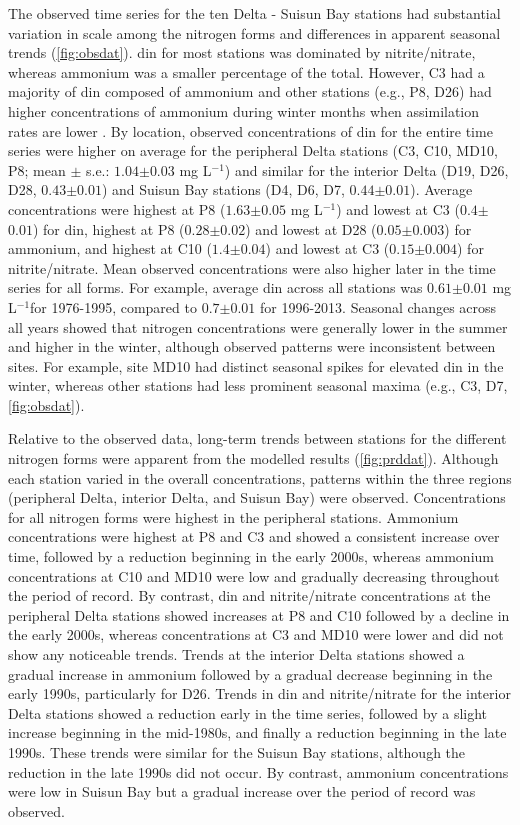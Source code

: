 \documentclass[letterpaper,12pt,oneside]{article}\usepackage[]{graphicx}\usepackage[]{color}
\newcommand{\mgl}{mg L$^{-1}$}
\begin{document}
The observed time series for the ten Delta - Suisun Bay stations had substantial variation in scale among the nitrogen forms and differences in apparent seasonal trends (\cref{fig:obsdat}).  \ac{din} for most stations was dominated by nitrite/nitrate, whereas ammonium was a smaller percentage of the total.  However, C3 had a majority of \ac{din} composed of ammonium and other stations (e.g., P8, D26) had higher concentrations of ammonium during winter months when assimilation rates are lower \citep{Novick15}.  By location, observed concentrations of \ac{din} for the entire time series were higher on average for the peripheral Delta stations (C3, C10, MD10, P8; mean $\pm$ s.e.: $1.04$$\pm$$0.03$ \mgl) and similar for the interior Delta (D19, D26, D28, $0.43$$\pm$$0.01$) and Suisun Bay stations (D4, D6, D7, $0.44$$\pm$$0.01$).  Average concentrations were highest at P8 ($1.63$$\pm$$0.05$ \mgl) and lowest at C3 ($0.4$$\pm$$0.01$) for \ac{din}, highest at P8 ($0.28$$\pm$$0.02$) and lowest at D28 ($0.05$$\pm$$0.003$) for ammonium, and highest at C10 ($1.4$$\pm$$0.04$) and lowest at C3 ($0.15$$\pm$$0.004$) for nitrite/nitrate. Mean observed concentrations were also higher later in the time series for all forms.  For example, average \ac{din} across all stations was $0.61$$\pm$$0.01$ \mgl for 1976-1995, compared to $0.7$$\pm$$0.01$ for 1996-2013. Seasonal changes across all years showed that nitrogen concentrations were generally lower in the summer and higher in the winter, although observed patterns were inconsistent between sites.  For example, site MD10 had distinct seasonal spikes for elevated \ac{din} in the winter, whereas other stations had less prominent seasonal maxima (e.g., C3, D7, \cref{fig:obsdat}).  

Relative to the observed data, long-term trends between stations for the different nitrogen forms were apparent from the modelled results (\cref{fig:prddat}).  Although each station varied in the overall concentrations, patterns within the three regions (peripheral Delta, interior Delta, and Suisun Bay) were observed.  Concentrations for all nitrogen forms were highest in the peripheral stations.  Ammonium concentrations were highest at P8 and C3 and showed a consistent increase over time, followed by a reduction beginning in the early 2000s, whereas ammonium concentrations at C10 and MD10 were low and gradually decreasing throughout the period of record.  By contrast, \ac{din} and nitrite/nitrate concentrations at the peripheral Delta stations showed increases at  P8 and C10 followed by a decline in the early 2000s, whereas concentrations at C3 and MD10 were lower and did not show any noticeable trends.  Trends at the interior Delta stations showed a gradual increase in ammonium followed by a gradual decrease beginning in the early 1990s, particularly for D26.  Trends in \ac{din} and nitrite/nitrate for the interior Delta stations showed a reduction early in the time series, followed by a slight increase beginning in the mid-1980s, and finally a reduction beginning in the late 1990s.  These trends were similar for the Suisun Bay stations, although the reduction in the late 1990s did not occur.  By contrast, ammonium concentrations were low in Suisun Bay but a gradual increase over the period of record was observed.  
\end{document}

